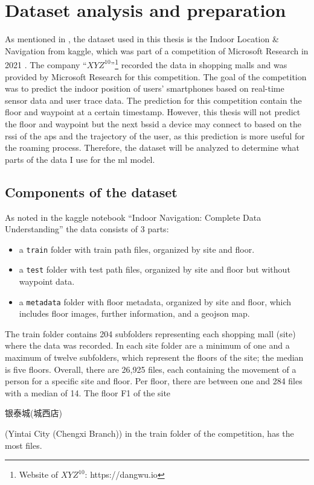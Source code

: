 \chapter{Dataset analysis and preparation}\label{ch:data-ana}

As mentioned in , the dataset used in this thesis is the Indoor Location \& Navigation from kaggle, which was part of a competition of Microsoft Research in 2021 \cite{IndoorLocationNavigation}.
The company ``\(XYZ^{10}\)''\footnote{Website of \(XYZ^{10}\): https://dangwu.io} recorded the data in shopping malls and was provided by Microsoft Research for this competition.
The goal of the competition was to predict the indoor position of users' smartphones based on real-time sensor data and user trace data.
The prediction for this competition contain the floor and waypoint at a certain timestamp.
However, this thesis will not predict the floor and waypoint but the next \ac{bssid} a device may connect to based on the \ac{rssi} of the \acp{ap} and the trajectory of the user, as this prediction is more useful for the roaming process.
Therefore, the dataset will be analyzed to determine what parts of the data I use for the \ac{ml} model.

\section{Components of the dataset}\label{sec:data}
As noted in the kaggle notebook ``Indoor Navigation: Complete Data Understanding'' \cite{IndoorNavigationUnderstanding} the data consists of 3 parts:

\begin{itemize}
    \item a \texttt{train} folder with train path files, organized by site and floor.
    \item a \texttt{test} folder with test path files, organized by site and floor but without waypoint data.
    \item a \texttt{metadata} folder with floor metadata, organized by site and floor, which includes floor images, further information, and a geojson map.
\end{itemize}

The train folder contains 204 subfolders representing each shopping mall (site) where the data was recorded.
In each site folder are a minimum of one and a maximum of twelve subfolders, which represent the floors of the site; the median is five floors.
Overall, there are 26,925 files, each containing the movement of a person for a specific site and floor.
Per floor, there are between one and 284 files with a median of 14.
The floor F1 of the site \begin{CJK*}{UTF8}{gbsn}银泰城(城西店)\end{CJK*} (Yintai City (Chengxi Branch)) in the train folder of the competition, has the most files.

